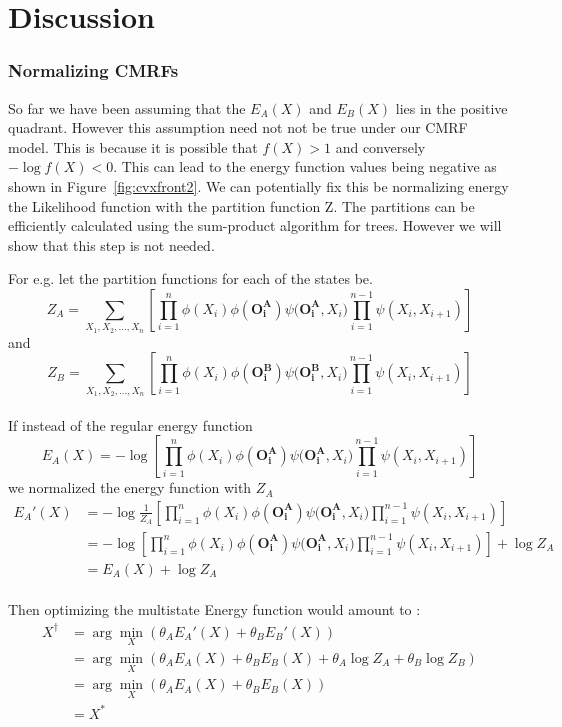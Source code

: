 \documentclass{article}
\begin{document}
\section{Discussion}


\subsubsection{Normalizing CMRFs}
So far we have been assuming that the $E_A(X)$ and $E_B(X)$ lies in the positive quadrant. However this assumption need not not be true under our CMRF model. This is because it is possible that $f(X) > 1$ and conversely $-\log f(X) < 0$. This can lead to the energy function values being negative as shown in Figure~\ref{fig:cvxfront2}. We can potentially fix this be normalizing energy the Likelihood function with the partition function Z. The partitions can be efficiently calculated using the sum-product algorithm for trees. However we will show that this step is not needed. 

For e.g. let the partition functions for each of the states be.
\[
Z_A = \sum_{X_1,X_2,\dotsc,X_n}\left[{\prod_{i=1}^{n}{\phi(X_i)\phi(\mathbf{O^A_i})\psi(\mathbf{O^A_i},X_i})\prod_{i=1}^{n-1}{\psi(X_i,X_{i+1})}}\right]
\]
and 
\[
Z_B = \sum_{X_1,X_2,\dotsc,X_n}\left[{\prod_{i=1}^{n}{\phi(X_i)\phi(\mathbf{O^B_i})\psi(\mathbf{O^B_i},X_i})\prod_{i=1}^{n-1}{\psi(X_i,X_{i+1})}}\right]
\]
\\
If instead of the regular energy function 
\[
E_A(X) = -\log  \left[{\prod_{i=1}^{n}{\phi(X_i)\phi(\mathbf{O^A_i})\psi(\mathbf{O^A_i},X_i})\prod_{i=1}^{n-1}{\psi(X_i,X_{i+1})}}\right]
\]
we normalized the energy function with $Z_A$
\[
\begin{split}
E_A'(X) &= -\log  \frac{1}{Z_A} \left[{\prod_{i=1}^{n}{\phi(X_i)\phi(\mathbf{O^A_i})\psi(\mathbf{O^A_i},X_i})\prod_{i=1}^{n-1}{\psi(X_i,X_{i+1})}}\right]\\
 &= -\log   \left[{\prod_{i=1}^{n}{\phi(X_i)\phi(\mathbf{O^A_i})\psi(\mathbf{O^A_i},X_i})\prod_{i=1}^{n-1}{\psi(X_i,X_{i+1})}}\right] + \log Z_A \\
	&= E_A(X) + \log Z_A
\end{split}
\]
\\
Then optimizing the multistate Energy function would amount to : 
\[
\begin{split}
X^{\dagger} &= \arg \min_X \left( \theta_A E_A'(X)  + \theta_B E_B'(X) \right) \\
 &= \arg \min_X \left( \theta_A E_A(X) + \theta_B E_B(X) + \theta_A \log Z_A + \theta_B \log Z_B \right) \\
 &= \arg \min_X \left( \theta_A E_A(X) + \theta_B E_B(X) \right) \\
  &= X^*
\end{split}
\]
\end{document}
